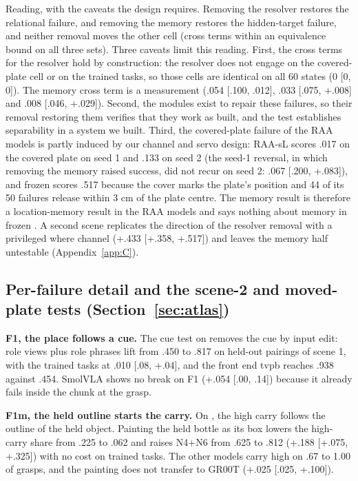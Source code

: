 Reading, with the caveats the design requires. Removing the resolver restores the relational failure, and removing the memory restores the hidden-target failure, and neither removal moves the other cell (cross terms within an equivalence bound on all three sets). Three caveats limit this reading. First, the cross terms for the resolver hold by construction: the resolver does not engage on the covered-plate cell or on the trained tasks, so those cells are identical on all 60 states (0 [0, 0]). The memory cross term is a measurement (\mi.054 [\mi.100, \mi.012], \mi.033 [\mi.075, +.008] and \mi.008 [\mi.046, +.029]). Second, the modules exist to repair these failures, so their removal restoring them verifies that they work as built, and the test establishes separability in a system we built. Third, the covered-plate failure of the RAA models is partly induced by our channel and servo design: RAA-sL scores .017 on the covered plate on seed 1 and .133 on seed 2 (the seed-1 reversal, in which removing the memory raised success, did not recur on seed 2: \mi.067 [\mi.200, +.083]), and frozen \pifive{} scores .517 because the cover marks the plate's position and 44 of its 50 failures release within 3 cm of the plate centre. The memory result is therefore a location-memory result in the RAA models and says nothing about memory in frozen \pifive. A second scene replicates the direction of the resolver removal with a privileged where channel (+.433 [+.358, +.517]) and leaves the memory half untestable (Appendix~\ref{app:C}).

\subsection{Per-failure detail and the scene-2 and moved-plate tests (Section~\ref{sec:atlas})}
\label{app:L3}

\textbf{F1, the place follows a cue.} The cue test on \pifive{} removes the cue by input edit: role views plus role phrases lift \pifive{} from .450 to .817 on held-out pairings of scene 1, with the trained tasks at \mi.010 [\mi.08, +.04], and the front end tvpb reaches .938 against .454. SmolVLA shows no break on F1 (+.054 [\mi.00, .14]) because it already fails inside the chunk at the grasp.

\textbf{F1m, the held outline starts the carry.} On \pifive, the high carry follows the outline of the held object. Painting the held bottle as its box lowers the high-carry share from .225 to .062 and raises N4+N6 from .625 to .812 (+.188 [+.075, +.325]) with no cost on trained tasks. The other models carry high on .67 to 1.00 of grasps, and the painting does not transfer to GR00T (+.025 [\mi.025, +.100]).

